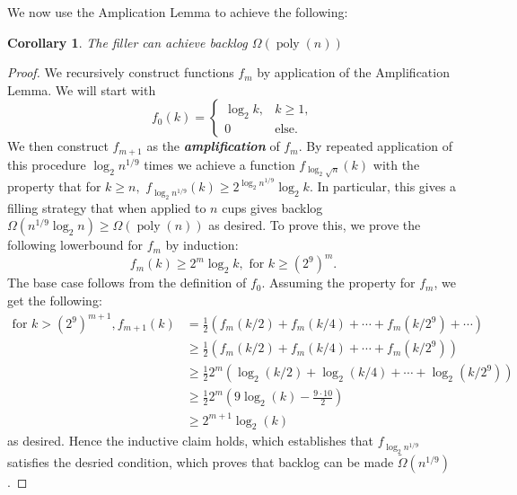 \documentclass{article}[11pt]
\newcommand{\defn}[1]{{\textit{\textbf{\boldmath #1}}}}
\DeclareMathOperator{\poly}{\text{poly}}
\newtheorem{corollary}{Corollary}
\begin{document}
We now use the Amplication Lemma to achieve the following:
\begin{corollary}
  \label{cor:poly}
  The filler can achieve backlog $\Omega(\poly(n))$
\end{corollary}
\begin{proof}
  We recursively construct functions $f_m$ by application of the Amplification
  Lemma. We will start with 
  $$f_0(k) = 
  \begin{cases} 
    \log_2 k, & k\geq 1, \\
    0 & \text{else.}
  \end{cases}$$
    We then construct $f_{m+1}$ as the
  \defn{amplification} of $f_m$.  
  By repeated application of this procedure $\log_2 n^{1/9}$ times we 
  achieve a function $f_{\log_2 \sqrt{n}}(k)$ with the property that for $k \geq n,$
  $f_{\log_2 n^{1/9}}(k) \geq 2^{\log_2 n^{1/9}} \log_2 k$. In particular, this gives a filling strategy 
  that when applied to $n$ cups gives backlog $\Omega(n^{1/9}\log_2 n) \ge \Omega(\poly(n))$ as desired.
  To prove this, we prove the following lowerbound for $f_m$ by induction:
  $$f_m(k) \geq 2^m \log_2 k, \text{ for } k \geq (2^9)^m.$$
  The base case follows from the definition of $f_0$. Assuming the property for $f_m$, we get the following:
  \begin{align}
    \text{for } k > (2^9)^{m+1}, f_{m+1}(k) &= \frac{1}{2}(f_m(k/2) + f_m(k/4) + \cdots + f_m(k/2^9) + \cdots)\\
  &\geq \frac{1}{2}(f_m(k/2) + f_m(k/4) + \cdots + f_m(k/2^9))\\
  &\geq \frac{1}{2}2^m(\log_2 (k/2) + \log_2(k/4) + \cdots + \log_2(k/2^9))\\
  &\geq \frac{1}{2}2^m(9\log_2 (k) - \frac{9 \cdot 10}{2}) \label{step:readydrop}\\
  &\geq 2^{m+1} \log_2(k) \label{step:dropped}
  \end{align}
  as desired. Hence the inductive claim holds, which establishes that $f_{\log_2
  n^{1/9}}$ satisfies the desried condition, which proves that backlog can be
  made $\tilde{\Omega}(n^{1/9})$.


\end{proof}
\end{document}
